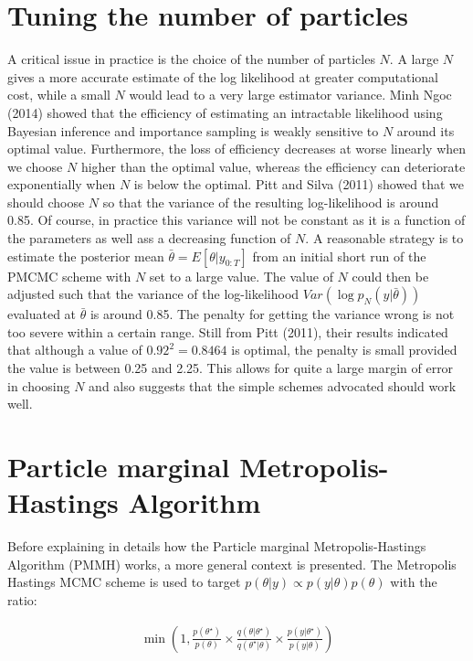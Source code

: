 \documentclass[11pt,a4,twosided,singlespacing,titlepagenumber=on]{scrreprt}
\numberwithin{equation}{chapter} %
\theoremstyle{remark}
\begin{document}
\section{Tuning the number of particles}
\label{sec:tuning_n}
A critical issue in practice is the choice of the number of particles $N$. A large $N$ gives a more accurate estimate of the log likelihood at greater computational cost, while a small $N$ would lead to a very large estimator variance. Minh Ngoc (2014) showed that the efficiency of estimating an intractable likelihood using Bayesian inference and importance sampling is weakly sensitive to $N$ around its optimal value. Furthermore, the loss of efficiency decreases at worse linearly when we choose $N$ higher than the optimal value, whereas
the efficiency can deteriorate exponentially when $N$ is below the optimal. Pitt and Silva (2011) showed that we should choose $N$ so that the variance of the resulting log-likelihood is around 0.85. Of course, in practice this variance will not be constant as it is a function of the parameters as well ass a decreasing function of $N$. A reasonable strategy is to estimate the posterior mean $\bar{\theta} = E[\theta|y_{0:T}]$ from an initial short run of the PMCMC scheme with $N$ set to a large value. The value of $N$ could then be adjusted such that the variance
of the log-likelihood $Var(\log p_N(y|\bar{\theta}))$ evaluated at $\bar{\theta}$ is around 0.85. The penalty for getting the variance wrong is not too severe within a certain range. Still from Pitt (2011), their results indicated that although a value of $0.92^2 = 0.8464$ is optimal, the penalty is small provided the value is between 0.25 and 2.25. This allows for quite a large margin of error in choosing $N$ and also suggests that the simple schemes advocated should work well.

\section{Particle marginal Metropolis-Hastings Algorithm}

Before explaining in details how the Particle marginal Metropolis-Hastings Algorithm (PMMH) works, a more general context is presented. The Metropolis Hastings MCMC scheme is used to target $p(\theta| y) \propto p(y|\theta)p(\theta)$ with the ratio:

\begin{align*}
\min \left( 1, \frac{p(\theta^\star)}{p(\theta)} \times  \frac{q(\theta|\theta^\star)}{q(\theta^\star|\theta)} \times \frac{p({y}|\theta^\star)}{p({y}|\theta)} \right)
\end{align*}
\end{document}
